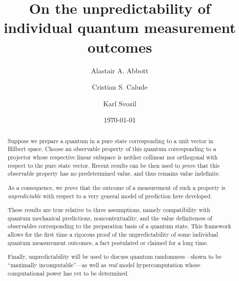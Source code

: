 \documentclass[%
 superscriptaddress,
 preprint,
 showpacs,
 showkeys,
 preprintnumbers,
  amsmath,amssymb,
  aps,
 pra,
  longbibliography,
  floatfix,
 ]{revtex4-1}
\theoremstyle{definition}
\begin{document}
	
\title{On the unpredictability of individual quantum measurement outcomes}
	
\author{Alastair A. Abbott}


\author{Cristian S. Calude}




\author{Karl Svozil}



\date{\today}

\begin{abstract}
Suppose  we prepare a quantum in a pure state corresponding to a unit vector in Hilbert space.
Choose an observable property of this quantum corresponding to a projector whose respective linear subspace is
neither collinear nor orthogonal with respect to the pure state vector. Recent results can be then used to {\em prove} that this observable property
has no predetermined value, and thus remains value indefinite.

As a consequence, we {\em prove} that the outcome of a measurement of such a property is {\em unpredictable} with respect to a very general model of prediction here developed.

These results are true relative to three assumptions, namely compatibility with quantum mechanical predictions, noncontextuality, and the value definiteness of observables corresponding to the preparation basis of a quantum state. This framework allows for the first time a rigorous proof of the unpredictability of some individual quantum measurement outcomes, a fact postulated or claimed for a long time.

Finally, unpredictability will be used to discuss quantum randomness---shown to be ``maximally incomputable''---as well as {\em real} model hypercomputation whose computational power has yet to be determined.\end{abstract}
\end{document}
